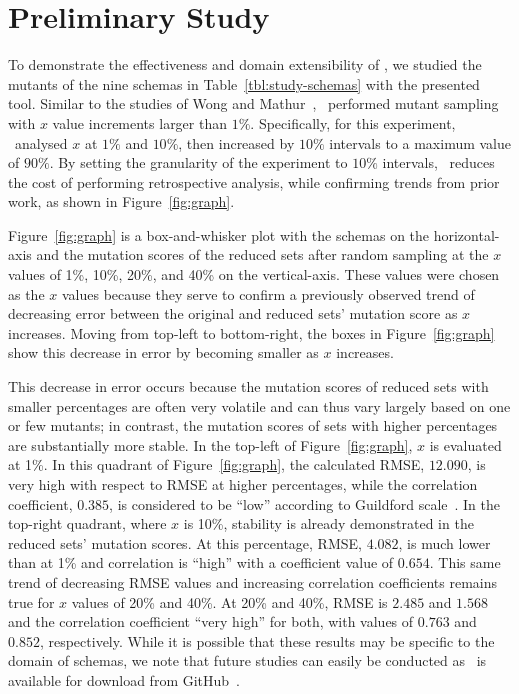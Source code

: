 \section{Preliminary Study}


To demonstrate the effectiveness and domain extensibility of \mrstudyr, we studied the mutants of the nine schemas in
Table~\ref{tbl:study-schemas} with the presented tool. Similar to the studies of Wong and Mathur~\cite{mathur1994empirical},
\mr~performed mutant sampling with $x$ value increments larger than $1\%$. Specifically, for this experiment, \mr~analysed
$x$ at $1\%$ and $10\%$, then increased by $10\%$ intervals to a maximum value of $90\%$. By setting the granularity of the
experiment to $10\%$ intervals, \mr~reduces the cost of performing retrospective analysis, while confirming trends from prior
work, as shown in Figure~\ref{fig:graph}.


Figure~\ref{fig:graph} is a box-and-whisker plot with the schemas on the horizontal-axis and the mutation scores of the reduced
sets after random sampling at the $x$ values of 1\%, 10\%, 20\%, and 40\% on the vertical-axis.  These values were chosen as the
$x$ values because they serve to confirm a previously observed trend of decreasing error between the original and reduced sets'
mutation score as $x$ increases. Moving from top-left to bottom-right, the boxes in Figure~\ref{fig:graph} show this decrease in
error by becoming smaller as $x$ increases.


This decrease in error occurs because the mutation scores of reduced sets with smaller percentages are often very volatile and can
thus vary largely based on one or few mutants; in contrast, the mutation scores of sets with higher percentages are substantially
more stable. In the top-left of Figure~\ref{fig:graph}, $x$ is evaluated at 1\%.  In this quadrant of Figure~\ref{fig:graph}, the
calculated RMSE, $12.090$, is very high with respect to RMSE at higher percentages, while the correlation coefficient, $0.385$, is
considered to be ``low'' according to Guildford scale~\cite{inozemtseva2014coverage}. In the top-right quadrant, where $x$ is 10\%,
stability is already demonstrated in the reduced sets' mutation scores. At this percentage, RMSE, $4.082$, is much lower than at 1\%
and correlation is ``high'' with a coefficient value of $0.654$. This same trend of decreasing RMSE values and increasing correlation
coefficients remains true for $x$ values of 20\% and 40\%. At 20\% and 40\%, RMSE is $2.485$ and $1.568$ and the correlation coefficient
``very high'' for both, with values of $0.763$ and $0.852$, respectively. While it is possible that these results may be specific to the
domain of schemas, we note that future studies can easily be conducted as \mr~is available for download from GitHub~\cite{tool}.


